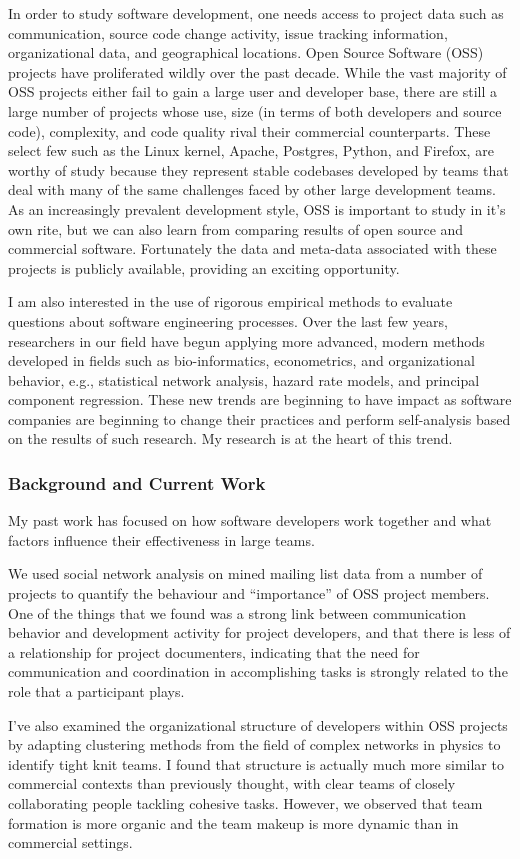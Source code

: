 \documentclass[10pt]{article}
\newcommand\Section[1]{\subsubsection*{\large #1}}
\begin{document}
\begin{small}
In order to study software development, one needs access to project data such
as communication, source code change activity, issue tracking information,
organizational data, and geographical locations.  Open Source Software (OSS)
projects have proliferated wildly over the past decade.  While the vast
majority of OSS projects either fail to gain a large user and developer base,
there are still a large number of projects whose use, size (in terms of both
developers and source code), complexity, and code quality rival their
commercial counterparts.  These select few such as the Linux kernel, Apache,
Postgres, Python, and Firefox, are worthy of study because they represent
stable codebases developed by teams that deal with many of the same challenges
faced by other large development teams.  As an increasingly prevalent
development style, OSS is important to study in it's own rite, but we can also
learn from comparing results of open source and commercial software.
Fortunately the data and meta-data associated with these projects is publicly
available, providing an exciting opportunity.

I am also interested in the use of rigorous empirical methods to evaluate
questions about software engineering processes.  Over the last few years,
researchers in our field have begun applying more advanced, modern methods
developed in fields such as bio-informatics, econometrics, and organizational
behavior, e.g., statistical network analysis, hazard rate models, and principal
component regression.  These new trends are beginning to have impact as
software companies are beginning to change their practices and perform
self-analysis based on the results of such research.  My research is at the
heart of this trend.

\Section{Background and Current Work}

My past work has focused on how software developers work together and what factors influence their
effectiveness in large teams.  

We used social network analysis on mined mailing list data from a number of
projects to quantify the behaviour and ``importance'' of OSS project members.
One of the things that we found was a strong link between communication
behavior and development activity for project developers, and that there is
less of a relationship for project documenters, indicating that the need for
communication and coordination in accomplishing tasks is strongly related to
the role that a participant plays.

I've also examined the organizational structure of developers within OSS
projects by adapting clustering methods from the field of complex networks in
physics to identify tight knit teams.  I found that structure is actually much
more similar to commercial contexts than previously thought, with clear teams
of closely collaborating people tackling cohesive tasks. However, we observed
that team formation is more organic and the team makeup is more dynamic than in
commercial settings.


\end{small}
\end{document}
